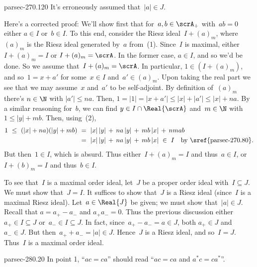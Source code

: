 \documentclass[b5page]{book}
\begin{document}
\begin{erratum}{parsec-270.120}
It's erroneously assumed that~$\left|a\right|\in J$.

Here's a corrected proof:
We'll show first that for~$a,b\in\scrA_+$
with~$ab=0$ either $a\in I$ or~$b\in I$.
To this end, consider
the Riesz ideal~$I+(a)_m$,
where~$(a)_m$ is the Riesz ideal generated by~$a$
from~(1).
Since~$I$ is maximal, either~$I+(a)_m=I$
or
$I+(a)_m=\scrA$.
In the former case, $a\in I$, 
and so we'd be done.
So we assume that~$I+(a)_m=\scrA$.
In particular, $1 \in (I+(a)_m)$,
and so~$1=x+a'$ for some~$x\in I$ and~$a'\in (a)_m$.
Upon taking the real part
we see that we may assume~$x$ and~$a'$ to be self-adjoint.
By definition of~$(a)_m$ there's $n\in \N$ with 
$\left|a'\right|\leq na$.
Then, $1=\left|1\right|=\left|x+a'\right|
\leq \left|x\right| + \left|a'\right|
\leq \left|x\right| + na$.
By a similar reasoning for~$b$,
we can find $y\in I\cap\Real{\scrA}$
and~$m\in\N$ with $1\leq\left|y\right|+mb$.
Then,
using~(2),
\begin{alignat*}{3}
1 \ \leq\ (\left|x\right| + na)(\left|y\right|+mb)
\ &= \ \left|x\right|\left|y\right| \,+\,
na\left|y\right|\,+\, mb\left|x\right|\,+\,nmab\\
\ &= \ \left|x\right|\left|y\right| \,+\,
na\left|y\right|\,+\, mb\left|x\right|
\ \in\ I\quad \text{by \sref{parsec-270.80}.}
\end{alignat*}
But then~$1\in I$, which is absurd.
Thus either~$I+(a)_m=I$ and thus~$a\in I$,
or~$I+(b)_m = I$ and thus~$b\in I$.

To see that~$I$ is a maximal order ideal,
let~$J$ be a proper order ideal with~$I\subseteq J$.
We must show that~$J=I$.
It suffices to show that~$J$ is a Riesz ideal
(since~$I$ is a maximal Riesz ideal).
Let~$a\in \Real{J}$ be given;
we must show that~$\left|a\right|\in J$.
Recall that $a=a_+-a_-$ and $a_+a_-=0$.
Thus the previous discussion either~$a_+\in I\subseteq J$
or~$a_-\in I\subseteq J$.
In fact, since~$a_+-a_- = a\in J$,
both $a_+\in  J$ and~$a_-\in J$.
But then~$a_++a_- = \left|a\right| \in J$.
Hence~$J$ is a Riesz ideal,
and so~$I=J$.
Thus~$I$ is a maximal order ideal.
\end{erratum}
\begin{erratum}{parsec-280.20}
In point 1,
``$ac=ca$'' should read
``$ac=ca$ and $a^*c=ca^*$''.
\end{erratum}
\end{document}
